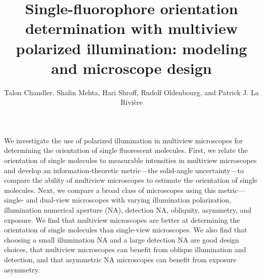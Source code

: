 \documentclass[10pt]{article}
\begin{document}
\title{Single-fluorophore orientation determination with multiview polarized
  illumination: modeling and microscope design}

\author{Talon Chandler, Shalin Mehta, Hari
  Shroff, Rudolf Oldenbourg, and Patrick J. La
  Rivi\`ere}
\address{University of Chicago, Department of Radiology, Chicago, Illinois 60637, USA\\
  Marine Biological Laboratory, Bell Center, Woods Hole, Massachusetts 02543, USA\\
  (present address) Chan Zuckerberg Biohub, San Francisco, California 94158, USA\\
  Section on High Resolution Optical Imaging, National Institute
  of Biomedical Imaging and Bioengineering, National Institutes of Health,
  Bethesda, Maryland 20892, USA\\
  Marine Biological Laboratory, Whitman Center, Woods Hole,
  Massachusetts 02543, USA\\
  Brown University, Department of Physics, Providence, Rhode
  Island 02912, USA}

\begin{abstract*}
  We investigate the use of polarized illumination in multiview microscopes for
  determining the orientation of single fluorescent molecules. First, we relate
  the orientation of single molecules to measurable intensities in multiview
  microscopes and develop an information-theoretic metric---the solid-angle
  uncertainty---to compare the ability of multiview microscopes to estimate the
  orientation of single molecules. Next, we compare a broad class of microscopes
  using this metric---single- and dual-view microscopes with varying
  illumination polarization, illumination numerical aperture (NA), detection NA,
  obliquity, asymmetry, and exposure. We find that multiview microscopes are
  better at determining the orientation of single molecules than single-view
  microscopes. We also find that choosing a small illumination NA and a large
  detection NA are good design choices, that multiview microscopes can benefit
  from oblique illumination and detection, and that asymmetric NA microscopes
  can benefit from exposure asymmetry.
\end{abstract*}
\end{document}
